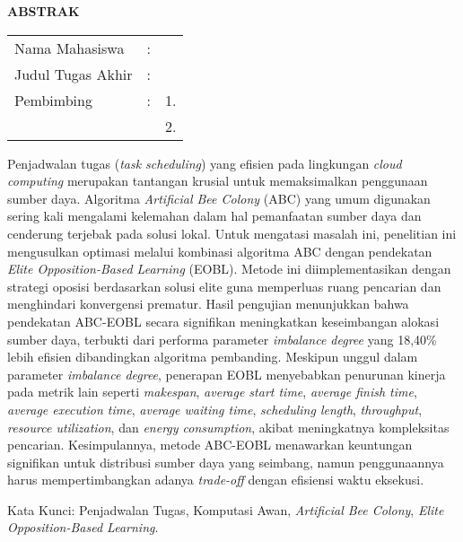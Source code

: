 \begin{center}
  \large\textbf{ABSTRAK}
\end{center}


\vspace{2ex}

\begingroup
\setlength{\tabcolsep}{0pt}

\noindent
\begin{tabularx}{\textwidth}{l >{\centering}m{2em} X}
  Nama Mahasiswa    & : & \name{}         \\

  Judul Tugas Akhir & : & \tatitle{}      \\

  Pembimbing        & : & 1. \advisor{}   \\
                    &   & 2. \coadvisor{} \\
\end{tabularx}
\endgroup

Penjadwalan tugas (\textit{task scheduling}) yang efisien pada lingkungan \textit{cloud computing} merupakan tantangan krusial untuk memaksimalkan penggunaan sumber daya. Algoritma \textit{Artificial Bee Colony} (ABC) yang umum digunakan sering kali mengalami kelemahan dalam hal pemanfaatan sumber daya dan cenderung terjebak pada solusi lokal. Untuk mengatasi masalah ini, penelitian ini mengusulkan optimasi melalui kombinasi algoritma ABC dengan pendekatan \textit{Elite Opposition-Based Learning} (EOBL). Metode ini diimplementasikan dengan strategi oposisi berdasarkan solusi elite guna memperluas ruang pencarian dan menghindari konvergensi prematur. Hasil pengujian menunjukkan bahwa pendekatan ABC-EOBL secara signifikan meningkatkan keseimbangan alokasi sumber daya, terbukti dari performa parameter \textit{imbalance degree} yang 18,40\% lebih efisien dibandingkan algoritma pembanding. Meskipun unggul dalam parameter \textit{imbalance degree}, penerapan EOBL menyebabkan penurunan kinerja pada metrik lain seperti \textit{makespan}, \textit{average start time}, \textit{average finish time}, \textit{average execution time}, \textit{average waiting time}, \textit{scheduling length}, \textit{throughput}, \textit{resource utilization}, dan \textit{energy consumption}, akibat meningkatnya kompleksitas pencarian. Kesimpulannya, metode ABC-EOBL menawarkan keuntungan signifikan untuk distribusi sumber daya yang seimbang, namun penggunaannya harus mempertimbangkan adanya \textit{trade-off} dengan efisiensi waktu eksekusi.

Kata Kunci: Penjadwalan Tugas, Komputasi Awan, \textit{Artificial Bee Colony}, \textit{Elite Opposition-Based Learning}.